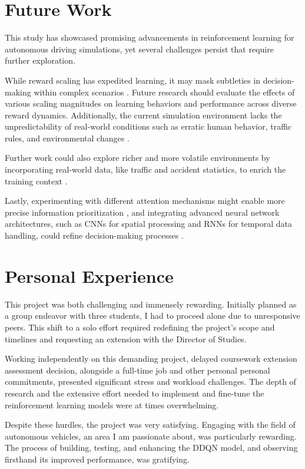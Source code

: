 \documentclass{article}
\begin{document}
\section{Future Work}

This study has showcased promising advancements in reinforcement learning for autonomous driving simulations, yet several challenges persist that require further exploration.

While reward scaling has expedited learning, it may mask subtleties in decision-making within complex scenarios \citep{silver2016mastering}. Future research should evaluate the effects of various scaling magnitudes on learning behaviors and performance across diverse reward dynamics. Additionally, the current simulation environment lacks the unpredictability of real-world conditions such as erratic human behavior, traffic rules, and environmental changes \citep{dosovitskiy2017carla}.

Further work could also explore richer and more volatile environments by incorporating real-world data, like traffic and accident statistics, to enrich the training context \citep{bojarski2016end}. 

Lastly, experimenting with different attention mechanisms might enable more precise information prioritization \citep{DBLP:journals/corr/VaswaniSPUJGKP17}, and integrating advanced neural network architectures, such as CNNs for spatial processing and RNNs for temporal data handling, could refine decision-making processes \citep{lecun2015deep}.

\section{Personal Experience}

This project was both challenging and immensely rewarding. Initially planned as a group endeavor with three students, I had to proceed alone due to unresponsive peers. This shift to a solo effort required redefining the project's scope and timelines and requesting an extension with the Director of Studies.

Working independently on this demanding project, delayed coursework extension assessment decision, alongside a full-time job and other personal personal commitments, presented significant stress and workload challenges. The depth of research and the extensive effort needed to implement and fine-tune the reinforcement learning models were at times overwhelming.

Despite these hurdles, the project was very satisfying. Engaging with the field of autonomous vehicles, an area I am passionate about, was particularly rewarding. The process of building, testing, and enhancing the DDQN model, and observing firsthand its improved performance, was gratifying.
\end{document}
